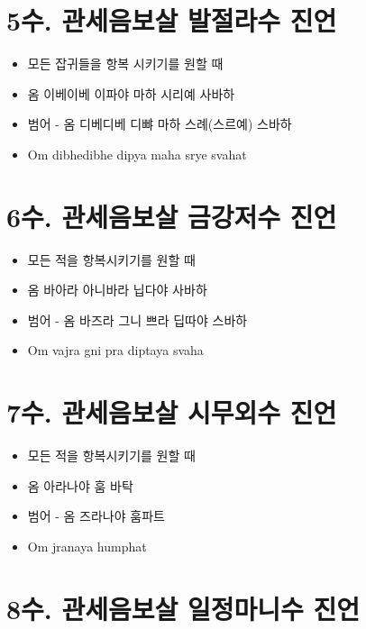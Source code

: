 \documentclass[12pt, a4paper, oneside]{book}
\let\stdsection\section
\renewcommand\section{\newpage\stdsection}
\begin{document}
\section{5수. 관세음보살 발절라수 진언}

			\begin{itemize}
			\item 모든 잡귀들을 항복 시키기를 원할 때
			\item 옴 이베이베 이파야 마하 시리예 사바하
			\item 범어 - 옴 디베디베 디뺘 마하 스례(스르예) 스바하
			\item Om dibhedibhe dipya maha srye svahat
			\end{itemize}



 


\section{6수. 관세음보살 금강저수 진언}

			\begin{itemize}
			\item 모든 적을 항복시키기를 원할 때
			\item 옴 바아라 아니바라 닙다야 사바하
			\item 범어 - 옴 바즈라 그니 쁘라 딥따야 스바하
			\item Om vajra gni pra diptaya svaha
			\end{itemize}





\section{7수. 관세음보살 시무외수 진언}

			\begin{itemize}
			\item 모든 적을 항복시키기를 원할 때
			\item 옴 아라나야 훔 바탁
			\item 범어 - 옴 즈라나야 훔파트
			\item Om jranaya humphat
			\end{itemize}





\section{8수. 관세음보살 일정마니수 진언}
\end{document}
